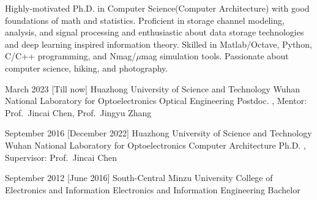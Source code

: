\documentclass[en]{resume}
\begin{document}
\makeheader

Highly-motivated Ph.D. in Computer Science(Computer Architecture)
with good foundations of math and statistics.
Proficient in storage channel modeling, analysis, and signal processing
and enthusiastic about data storage technologies and deep learning inspired information theory.
Skilled in Matlab/Octave, Python, C/C++ programming, and Nmag/$\mu$mag simulation tools.
Passionate about computer science, hiking, and photography.


\begin{educations}
  \education%
  {March 2023}%
    [Till now]%
    {Huazhong University of Science and Technology}%
    {Wuhan National Laboratory for Optoelectronics}%
    {Optical Engineering}%
    {Postdoc.}%
    {, Mentor: Prof.~Jincai Chen, Prof.~Jingyu Zhang}%

  \separator{0.5ex}
  \education%
    {September 2016}%
    [December 2022]%
    {Huazhong University of Science and Technology}%
    {Wuhan National Laboratory for Optoelectronics}%
    {Computer Architecture}%
    {Ph.D.}%
    {, Supervisor: Prof.~Jincai Chen}%

    \separator{0.5ex}
  \education%
    {September 2012}%
    [June 2016]%
    {South-Central Minzu University}%
    {College of Electronics and Information}%
    {Electronics and Information Engineering}%
    {Bachelor}%
    {}%

\end{educations}
\end{document}
